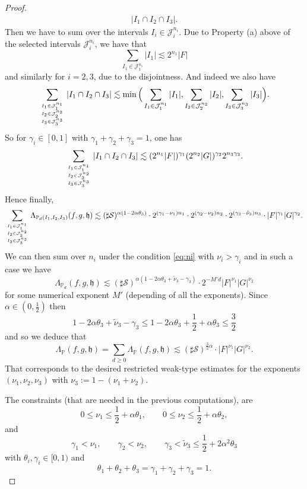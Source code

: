 \documentclass[a4paper,11pt,oneside]{amsart}
\newcommand{\hh}{\mathfrak{h}}
\newcommand{\PP}{\mathbb{P}}
\theoremstyle{plain}
\theoremstyle{definition}
\begin{document}
\begin{proof}
\begin{align*}
 |I_1 \cap I_2 \cap I_3|.
 \end{align*}
Then we have to sum over the intervals  
$I_i\in {\mathcal J}_i^{n_i}$. Due to Property (a) above of the selected intervals ${\mathcal J}_i^{n_i}$, we have that
$$ \sum_{I_1\in{\mathcal J}_1^{n_1}} |I_1| \lesssim 2^{n_1} |F|$$
and similarly for $i=2,3$, due to the disjointness. And indeed we also have
$$ \sum_{I_1\in{\mathcal J}_1^{n_1} \atop {I_2\in{\mathcal J}_2^{n_2} \atop I_3\in{\mathcal J}_3^{n_3}}} |I_1\cap I_2 \cap I_3| \lesssim \min\Big(\sum_{I_1\in{\mathcal J}_1^{n_1}} |I_1|,\sum_{I_2\in{\mathcal J}_2^{n_2}} |I_2|,\sum_{I_3\in{\mathcal J}_3^{n_3}} |I_3|\Big). $$
So for $\gamma_i\in[0,1]$ with $\gamma_1+\gamma_2+\gamma_3=1$, one has
$$ \sum_{I_1\in{\mathcal J}_1^{n_1} \atop {I_2\in{\mathcal J}_2^{n_2} \atop I_3\in{\mathcal J}_3^{n_3}}} |I_1\cap I_2 \cap I_3| \lesssim (2^{n_1}|F|)^{\gamma_1} (2^{n_2}|G|)^{\gamma_2} 2^{n_3\gamma_3}. $$
Hence finally,
\begin{align*}
 \sum_{I_1\in{\mathcal J}_1^{n_1} \atop {I_2\in{\mathcal J}_2^{n_2} \atop I_3\in{\mathcal J}_3^{n_3}}} \Lambda_{\PP_d(I_1,I_2,I_3)}(f,g,\hh)  \lesssim (\sharp {\mathcal S})^{\alpha(1-2\alpha \theta_3)} \cdot 2^{(\gamma_1-\nu_1) n_1}  \cdot 2^{(\gamma_2-\nu_2) n_2} \cdot 2^{(\gamma_3- \tilde \nu_3) n_3} \cdot
 |F|^{\gamma_1} |G|^{\gamma_2}.
 \end{align*}
We can then sum over $n_i$ under the condition \eqref{eq:ni} with $\nu_i> \gamma_i$ and in such a case we have
$$ \Lambda_{\PP_d}(f,g,\hh) \lesssim (\sharp {\mathcal S})^{\alpha(1-2\alpha \theta_3+\tilde \nu_3-\gamma_3)} \cdot 2^{-M'd}|F|^{\nu_1} |G|^{\nu_2}$$
for some numerical exponent $M'$ (depending of all the exponents). Since $\alpha\in(0,\frac{1}{2})$ then
$$ 1-2\alpha \theta_3+\tilde \nu_3-\gamma_3 \leq 1-2\alpha \theta_3 + \frac{1}{2}+\alpha \theta_3 \leq \frac{3}{2}$$
and so we deduce that
\begin{equation} \Lambda_{\PP}(f,g,\hh) = \sum_{d\geq 0} \Lambda_{\PP}(f,g,\hh) \lesssim (\sharp {\mathcal S})^{\frac{3}{2}\alpha} \cdot |F|^{\nu_1} |G|^{\nu_2}. \label{eq:td}
\end{equation}
That corresponds to the desired restricted weak-type estimates for the exponents $(\nu_1,\nu_2,\nu_3)$ with $\nu_3:=1-(\nu_1+\nu_2)$.

The constraints (that are needed in the previous computations), are
$$ 0\leq \nu_1\leq \frac{1}{2}+\alpha \theta_1, \qquad 0\leq \nu_2\leq \frac{1}{2}+\alpha \theta_2,$$
and
$$ \gamma_1<\nu_1, \qquad \gamma_2<\nu_2, \qquad \gamma_3<\tilde \nu_3 \leq \frac{1}{2}+2\alpha^2 \theta_3$$
with $\theta_i,\gamma_i\in[0,1)$ and 
$$ \theta_1+\theta_2+\theta_3=\gamma_1+\gamma_2+\gamma_3=1.$$



\end{proof}
\end{document}
